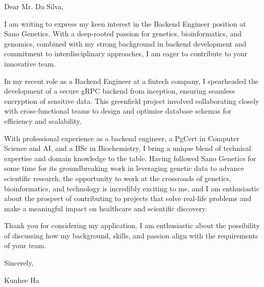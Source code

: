 \documentclass{article}
\begin{document}
\color{BodyGrey}
Dear Mr. Da Silva,
\vspace{15pt}

I am writing to express my keen interest in the Backend Engineer position at Sano Genetics. With a deep-rooted passion for genetics, bioinformatics, and genomics, combined with my strong background in backend development and commitment to interdisciplinary approaches, I am eager to contribute to your innovative team.
\vspace{15pt}


In my recent role as a Backend Engineer at a fintech company, I spearheaded the development of a secure gRPC backend from inception, ensuring seamless encryption of sensitive data. This greenfield project involved collaborating closely with cross-functional teams to design and optimise database schemas for efficiency and scalability.
\vspace{15pt}


With professional experience as a backend engineer, a PgCert in Computer Science and AI, and a BSc in Biochemistry, I bring a unique blend of technical expertise and domain knowledge to the table. Having followed Sano Genetics for some time for its groundbreaking work in leveraging genetic data to advance scientific research, the opportunity to work at the crossroads of genetics, bioinformatics, and technology is incredibly exciting to me, and I am enthusiastic about the prospect of contributing to projects that solve real-life problems and make a meaningful impact on healthcare and scientific discovery.
\vspace{15pt}


Thank you for considering my application. I am enthusiastic about the possibility of discussing how my background, skills, and passion align with the requirements of your team.
\vspace{15pt}


Sincerely,

Kunhee Ha
\end{document}
